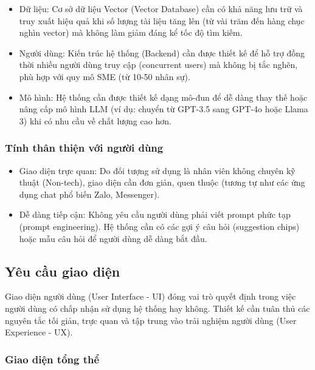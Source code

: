 \begin{itemize}
\item
  Dữ liệu: Cơ sở dữ liệu Vector (Vector Database) cần có khả năng lưu
  trữ và truy xuất hiệu quả khi số lượng tài liệu tăng lên (từ vài trăm
  đến hàng chục nghìn vector) mà không làm giảm đáng kể tốc độ tìm kiếm.
\item
  Người dùng: Kiến trúc hệ thống (Backend) cần được thiết kế để hỗ trợ
  đồng thời nhiều người dùng truy cập (concurrent users) mà không bị tắc
  nghẽn, phù hợp với quy mô SME (từ 10-50 nhân sự).
\item
  Mô hình: Hệ thống cần được thiết kế dạng mô-đun để dễ dàng thay thế
  hoặc nâng cấp mô hình LLM (ví dụ: chuyển từ GPT-3.5 sang GPT-4o hoặc
  Llama 3) khi có nhu cầu về chất lượng cao hơn.
\end{itemize}

\subsubsection{Tính thân thiện với người
dùng}\label{tuxednh-thuxe2n-thiux1ec7n-vux1edbi-ngux1b0ux1eddi-duxf9ng}

\begin{itemize}
\item
  Giao diện trực quan: Do đối tượng sử dụng là nhân viên không chuyên kỹ
  thuật (Non-tech), giao diện cần đơn giản, quen thuộc (tương tự như các
  ứng dụng chat phổ biến Zalo, Messenger).
\item
  Dễ dàng tiếp cận: Không yêu cầu người dùng phải viết prompt phức tạp
  (prompt engineering). Hệ thống cần có các gợi ý câu hỏi (suggestion
  chips) hoặc mẫu câu hỏi để người dùng dễ dàng bắt đầu.
\end{itemize}

\subsection{Yêu cầu giao diện}\label{yuxeau-cux1ea7u-giao-diux1ec7n}

Giao diện người dùng (User Interface - UI) đóng vai trò quyết định trong
việc người dùng có chấp nhận sử dụng hệ thống hay không. Thiết kế cần
tuân thủ các nguyên tắc tối giản, trực quan và tập trung vào trải nghiệm
người dùng (User Experience - UX).

\subsubsection{Giao diện tổng thể}\label{giao-diux1ec7n-tux1ed5ng-thux1ec3}

